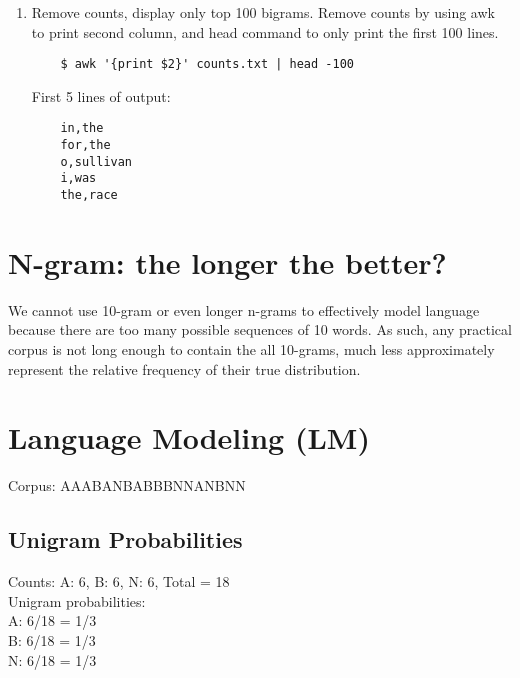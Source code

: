 \documentclass{article}
\begin{document}
\begin{enumerate}
  \item Remove counts, display only top 100 bigrams. Remove counts by using awk to print second column, and head command to only print the first 100 lines.
  \begin{lstlisting}
    $ awk '{print $2}' counts.txt | head -100\end{lstlisting}
  First 5 lines of output:
  \begin{lstlisting}
    in,the
    for,the
    o,sullivan
    i,was
    the,race\end{lstlisting}
\end{enumerate}

\section{N-gram: the longer the better?}
We cannot use 10-gram or even longer n-grams to effectively model language because there are too many possible sequences of 10 words. As such, any practical corpus is not long enough to contain the all 10-grams, much less approximately represent the relative frequency of their true distribution.

\section{Language Modeling (LM)}
Corpus: AAABANBABBBNNANBNN

\subsection{Unigram Probabilities}
Counts: A: 6, B: 6, N: 6, Total = 18\\
Unigram probabilities:\\
A: 6/18 = 1/3\\
B: 6/18 = 1/3\\
N: 6/18 = 1/3
\end{document}
